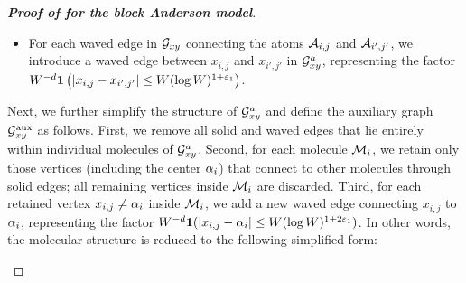 \begin{proof}[\bf Proof of  for the block Anderson model]
\begin{itemize}
\item For each waved edge in $\cal G_{xy}$ connecting the atoms $\cal A_{i,j}$ and $\cal A_{i',j'}$, we introduce a waved edge between $x_{i,j}$ and $x_{i',j'}$ in $\cal G^{a}_{xy}$, representing the factor $W^{-d}\mathbf 1 \left(|x_{i,j}-x_{i',j'}|\le W(\log W)^{1+\e_1}\right)$.

\end{itemize}
Next, we further simplify the structure of $\cal G^{a}_{xy}$ and define the auxiliary graph $\cal G^{\aux}_{xy}$ as follows.
First, we remove all solid and waved edges that lie entirely within individual molecules of $\cal G^{a}_{xy}$.
Second, for each molecule $\Mol_i$, we retain only those vertices (including the center $\al_i$) that connect to other molecules through solid edges; all remaining vertices inside $\Mol_i$ are discarded. 
Third, for each retained vertex $x_{i,j}\ne \al_i$ inside $\Mol_i$, we add a new waved edge connecting $x_{i,j}$ to $\al_i$, representing the factor $W^{-d}\mathbf 1(|x_{i,j}-\al_i|\le W(\log W)^{1+2\e_1})$.
In other words, the molecular structure is reduced to the following simplified form:
\be  \nonumber%
\parbox[c]{0.8\linewidth}{
\begin{center}
\end{center}}
\end{proof}
